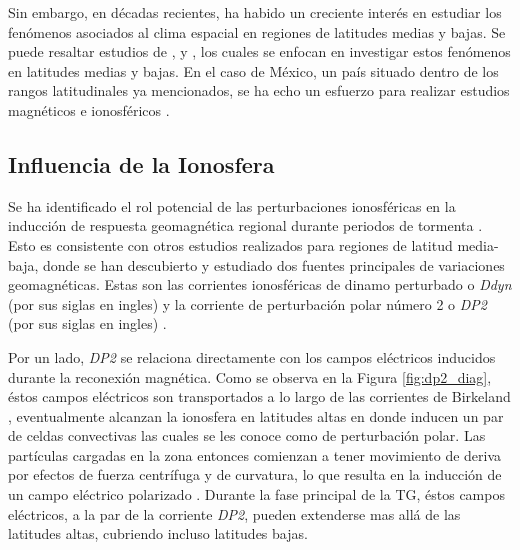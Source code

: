 Sin embargo, en décadas recientes, ha habido un creciente interés en estudiar los fenómenos asociados al clima espacial en regiones de latitudes medias y bajas. Se puede resaltar estudios de \cite{gic_czech, gic_brazil}, y \cite{gic}, los cuales se enfocan en investigar estos fenómenos en latitudes medias y bajas. En el caso de México, un país situado dentro de los rangos latitudinales ya mencionados, se ha echo un esfuerzo para realizar estudios magnéticos e ionosféricos \parencite{MEXART2003, MEXART2005, lenica, MEXART_iono_dist, MEXART_iono_dist2, mario_rodriguez2011, lopez-montes, mario_rodriguez2014, iono-resp2016}. 

\subsection{Influencia de la Ionosfera}
\label{diono}

Se ha identificado el rol potencial de las perturbaciones ionosféricas en la inducción de respuesta geomagnética regional durante periodos de tormenta \parencite[see]{esmeralda, dramaria_1, dramaria7, P-corona1, P-corona2}. Esto es consistente con otros estudios realizados para regiones de latitud media-baja, donde se han descubierto y estudiado dos fuentes principales de variaciones geomagnéticas. Estas son las corrientes ionosféricas de dinamo perturbado o \emph{Ddyn} (por sus siglas en ingles) \parencite{blanc_ddyn} y la corriente de perturbación polar número 2 o \emph{DP2} (por sus siglas en ingles) \parencite{nishida_68_coherence, nishida_68_fluctuations, nishida_66_knee}.
\vspace{1 em}

Por un lado, \emph{DP2} se relaciona directamente con los campos eléctricos inducidos durante la reconexión magnética. Como se observa en la Figura \ref{fig:dp2_diag}, éstos campos eléctricos son transportados a lo largo de las corrientes de Birkeland \parencite{dp2PPEF, dp2_diag}, eventualmente alcanzan la ionosfera en latitudes altas en donde inducen un par de celdas convectivas las cuales se les conoce como de perturbación polar. Las partículas cargadas en la zona entonces comienzan a tener movimiento de deriva por efectos de fuerza centrífuga y de curvatura, lo que resulta en la inducción de un campo eléctrico polarizado \parencite{Hepner_a, Hepner_b, Pudovkin, blanc_caudal, Denisenko}. Durante la fase principal de la TG, éstos campos eléctricos, a la par de la corriente \emph{DP2}, pueden extenderse mas allá de las latitudes altas, cubriendo incluso latitudes bajas\parencite{nishida_66_knee, nishida_68_coherence, nishida_andobayashi_67}.
\vspace{1 em}

